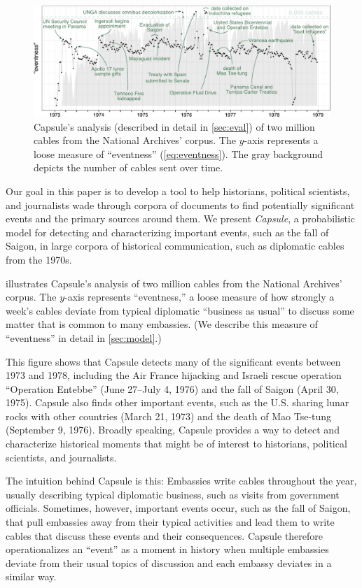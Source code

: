 \begin{figure}[ht]
\centering
\includegraphics[width=\linewidth]{fig/cables_events.pdf}
\caption{Capsule's analysis  (described in detail in \cref{sec:eval}) of two million cables from the National
  Archives' corpus. The $y$-axis represents a loose measure of
  ``eventness'' (\cref{eq:eventness}). The gray background depicts the
  number of cables sent over time.}
\label{fig:cables_events}
\end{figure}

Our goal in this paper is to develop a tool to help historians,
political scientists, and journalists wade through corpora of
documents to find potentially significant events and the primary
sources around them. We present \textit{Capsule}, a probabilistic
model for detecting and characterizing important events, such as the
fall of Saigon, in large corpora of historical communication, such as
diplomatic cables from the 1970s.

 illustrates Capsule's analysis of two million
cables from the National Archives' corpus. The \mbox{$y$-axis}
represents ``eventness,'' a loose measure of how strongly a week's
cables deviate from typical diplomatic ``business as usual'' to
discuss some matter that is common to many embassies. (We describe
this measure of ``eventness'' in detail in \cref{sec:model}.)

This figure shows that Capsule detects many of the significant events
between 1973 and 1978, including the Air France hijacking and Israeli
rescue operation ``Operation Entebbe'' (June 27--July 4, 1976) and the
fall of Saigon (April 30, 1975). Capsule also finds other important
events, such as the U.S. sharing lunar rocks with other countries
(March 21, 1973) and the death of Mao Tse-tung (September 9,
1976). Broadly speaking, Capsule provides a way to detect and
characterize historical moments that might be of interest to
historians, political scientists, and journalists.

The intuition behind Capsule is this: Embassies write cables
throughout the year, usually describing typical diplomatic business,
such as visits from government officials. Sometimes, however,
important events occur, such as the fall of Saigon, that pull
embassies away from their typical activities and lead them to write
cables that discuss these events and their consequences. Capsule
therefore operationalizes an ``event'' as a moment in history when
multiple embassies deviate from their usual topics of discussion and
each embassy deviates in a similar way.

